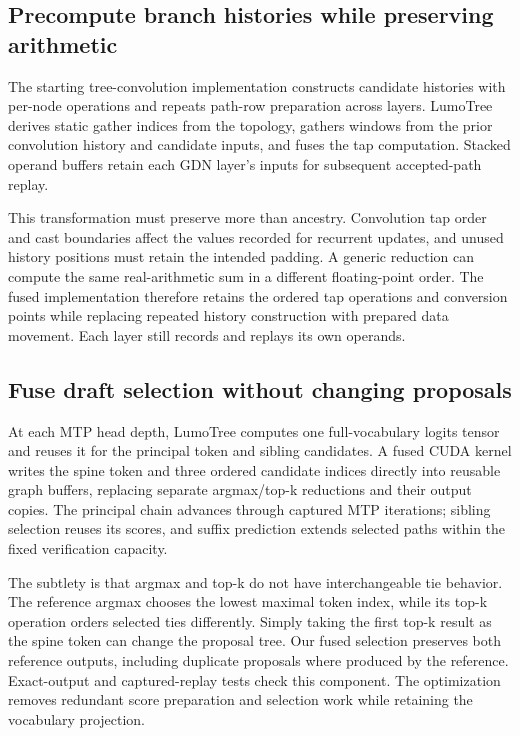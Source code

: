 \documentclass[conference]{IEEEtran}
\newcommand{\sys}{LumoTree}
\begin{document}
\subsection{Precompute branch histories while preserving arithmetic}
The starting tree-convolution implementation constructs candidate histories with per-node operations and repeats path-row preparation across layers. \sys{} derives static gather indices from the topology, gathers windows from the prior convolution history and candidate inputs, and fuses the tap computation. Stacked operand buffers retain each GDN layer's inputs for subsequent accepted-path replay.

This transformation must preserve more than ancestry. Convolution tap order and cast boundaries affect the values recorded for recurrent updates, and unused history positions must retain the intended padding. A generic reduction can compute the same real-arithmetic sum in a different floating-point order. The fused implementation therefore retains the ordered tap operations and conversion points while replacing repeated history construction with prepared data movement. Each layer still records and replays its own operands.

\subsection{Fuse draft selection without changing proposals}
At each MTP head depth, \sys{} computes one full-vocabulary logits tensor and reuses it for the principal token and sibling candidates. A fused CUDA kernel writes the spine token and three ordered candidate indices directly into reusable graph buffers, replacing separate argmax/top-k reductions and their output copies. The principal chain advances through captured MTP iterations; sibling selection reuses its scores, and suffix prediction extends selected paths within the fixed verification capacity.

The subtlety is that argmax and top-k do not have interchangeable tie behavior. The reference argmax chooses the lowest maximal token index, while its top-k operation orders selected ties differently. Simply taking the first top-k result as the spine token can change the proposal tree. Our fused selection preserves both reference outputs, including duplicate proposals where produced by the reference. Exact-output and captured-replay tests check this component. The optimization removes redundant score preparation and selection work while retaining the vocabulary projection.
\end{document}
